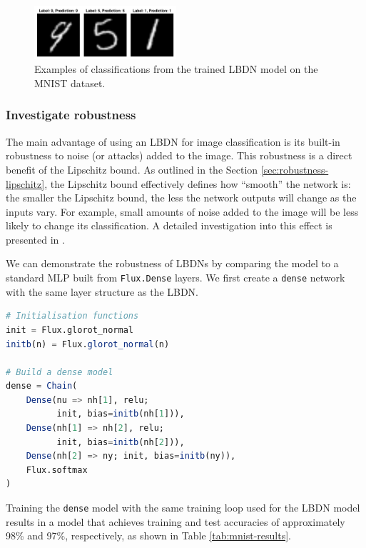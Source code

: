 \begin{figure}[!t]
    \centering
    \includegraphics[width=0.47\textwidth]{Images/lbdn_mnist.pdf}
    \caption{Examples of classifications from the trained LBDN model on the MNIST dataset.}
    \label{fig:mnist_numbers}
\end{figure}

\subsubsection{Investigate robustness} \label{sec:mnist-robustness}

The main advantage of using an LBDN for image classification is its built-in robustness to noise (or attacks) added to the image. This robustness is a direct benefit of the Lipschitz bound. As outlined in the Section \ref{sec:robustness-lipschitz}, the Lipschitz bound effectively defines how ``smooth'' the network is: the smaller the Lipschitz bound, the less the network outputs will change as the inputs vary. For example, small amounts of noise added to the image will be less likely to change its classification. A detailed investigation into this effect is presented in \cite{Wang+Manchester2023}.

We can demonstrate the robustness of LBDNs by comparing the model to a standard MLP built from \verb|Flux.Dense| layers. We first create a \verb|dense| network with the same layer structure as the LBDN.
\begin{lstlisting}[language = Julia]
# Initialisation functions
init = Flux.glorot_normal
initb(n) = Flux.glorot_normal(n)

# Build a dense model
dense = Chain(
    Dense(nu => nh[1], relu; 
          init, bias=initb(nh[1])),
    Dense(nh[1] => nh[2], relu; 
          init, bias=initb(nh[2])),
    Dense(nh[2] => ny; init, bias=initb(ny)),
    Flux.softmax
)
\end{lstlisting}

Training the \verb|dense| model with the same training loop used for the LBDN model results in a model that achieves training and test accuracies of approximately 98\% and 97\%, respectively, as shown in Table \ref{tab:mnist-results}.

\begin{table} [ht]
\label{tab:mnist-results}
\end{table}

